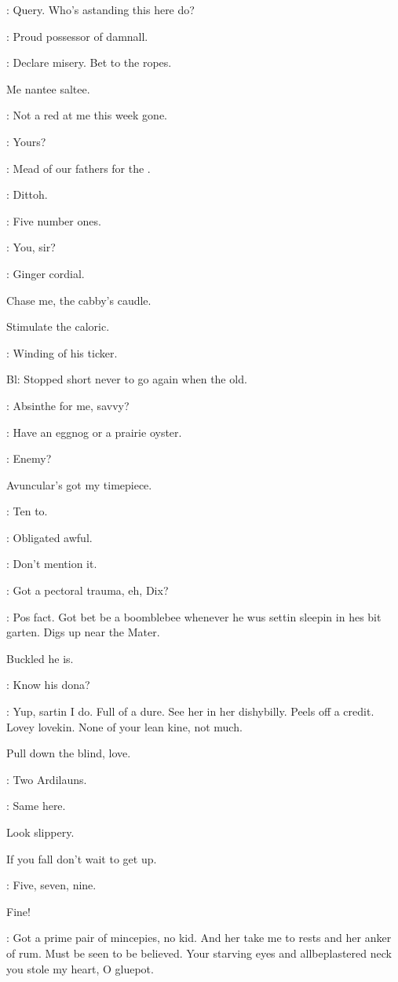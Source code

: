 \documentclass[12pt]{article}
\begin{document}
\Ln: Query. Who's astanding this here do?

\Md: Proud possessor of damnall.

\Ly: Declare misery. Bet to the ropes.

Me nantee saltee.

\Dx: Not a red at me this week gone.

\Br: Yours?

\SD: Mead of our fathers for the .

\Ba: Dittoh.

\SD: Five number ones.

\Br: You, sir?

\Bl: Ginger cordial.

Chase me, the cabby's caudle.

Stimulate the caloric.

: Winding of his ticker.

Bl: Stopped short never to go again when the old.

\SD: Absinthe for me, savvy?

\Mu:  Have an eggnog or a prairie oyster.

\Bl: Enemy?

Avuncular's got my timepiece.

\Md: Ten to.

\Bl: Obligated awful.

\Md: Don't mention it.

\Ly: Got a pectoral trauma, eh, Dix?

\Dx: Pos fact. Got bet be a boomblebee whenever he wus
settin sleepin in hes bit garten.
Digs up near the Mater.

Buckled he is.

\Mu: Know his dona?

\Dx: Yup, sartin I do. Full of a dure. See her in her dishybilly.
Peels off a credit. Lovey lovekin. None of your lean kine, not much.

Pull down the blind, love.

\Md: Two Ardilauns.

\Ly: Same here.

Look slippery.

If you fall don't wait to get up.

\Br: Five, seven, nine.

Fine!

\Dx: Got a prime pair of mincepies, no kid.
And her take me to rests and her anker of rum.
Must be seen to be believed.
Your starving eyes and allbeplastered neck you stole my heart, O gluepot.
\end{document}

